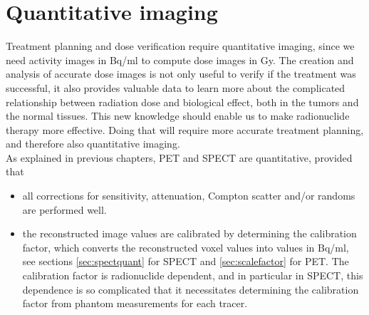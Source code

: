 \section{Quantitative imaging}
Treatment planning and dose verification require quantitative imaging,
since we need activity images in Bq/ml to compute dose images in
Gy. The creation and analysis of accurate dose images is not only
useful to verify if the treatment was successful, it also provides
valuable data to learn more about the complicated relationship between
radiation dose and biological effect, both in the tumors and the
normal tissues. This new knowledge should enable us to make
radionuclide therapy more effective. Doing that will require
more accurate treatment planning, and therefore also quantitative
imaging.\\[3mm]
%
As explained in previous chapters, PET and SPECT are quantitative,
provided that
\begin{itemize}
\item all corrections for sensitivity, attenuation, Compton
  scatter and/or randoms are performed well. 
\item the reconstructed image values are calibrated by determining the
  calibration factor, which converts the reconstructed voxel values
  into values in Bq/ml, see sections \ref{sec:spectquant} for SPECT
  and \ref{sec:scalefactor} for PET. The calibration factor is
  radionuclide dependent, and in particular in SPECT, this dependence
  is so complicated that it necessitates determining the calibration
  factor from phantom measurements for each tracer.
\end{itemize}



%

